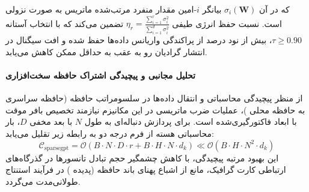 که در آن $\sigma_i(\mathbf{W})$ بیانگر $i$-امین مقدار منفرد مرتب‌شده ماتریس به صورت نزولی است. نسبت حفظ انرژی طیفی $\eta_r = \frac{\sum_{i=1}^r \sigma_i^2}{\sum_{i=1}^{d} \sigma_i^2}$ تضمین می‌کند که با انتخاب آستانه $\tau \ge 0.90$، بیش از نود درصد از پراکندگی واریانس داده‌ها حفظ شده و افت سیگنال در انتشار گرادیان رو به عقب به حداقل ممکن کاهش می‌یابد.

\paragraph{تحلیل مجانبی و پیچیدگی اشتراک حافظه سخت‌افزاری}
از منظر پیچیدگی محاسباتی و انتقال داده‌ها در سلسومراتب حافظه (حافظه سراسری  به حافظه محلی )، عملیات ضرب ماتریسی در این مکانیزم نیازمند تخصیص بافر موقت با ابعاد فاکتورگیری‌شده است. برای پردازش دنباله‌ای به طول $N$ با بعد مخفی $D$، بار محاسباتی هسته از فرم درجه دو به رابطه زیر تقلیل می‌یابد:
\begin{equation}
\label{eq:complexity_sparsegpt}
\mathcal{C}_{\text{sparsegpt}} = \mathcal{O}\left( B \cdot N \cdot D \cdot r + B \cdot H \cdot N \cdot d_k \right) \ll \mathcal{O}\left( B \cdot H \cdot N^2 \cdot d_k \right)
\end{equation}
این بهبود مرتبه پیچیدگی، با کاهش چشمگیر حجم تبادل تانسورها در گذرگاه‌های ارتباطی کارت گرافیک، مانع از اشباع پهنای باند حافظه (پدیده ) در فرآیند استنتاج طولانی‌مدت می‌گردد.
